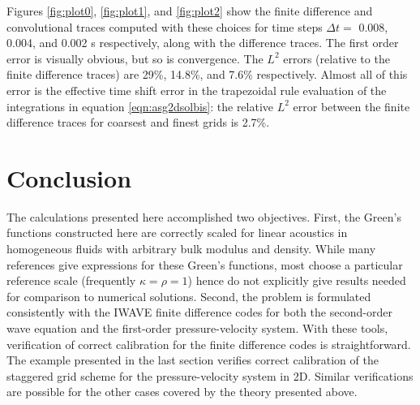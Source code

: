 Figures \ref{fig:plot0}, \ref{fig:plot1}, and \ref{fig:plot2} show
the finite difference and convolutional traces computed with these choices for time steps $\Delta t = $
0.008, 0.004, and 0.002 s respectively, along with the difference
traces. The first order error is visually obvious, but so is
convergence. The $L^2$ errors (relative to the finite difference
traces) are 29\%, 14.8\%, and 7.6\% respectively. Almost all of this
error is the effective time shift error in the trapezoidal rule evaluation of
the integrations in equation \ref{eqn:asg2dsolbis}: the relative $L^2$
error between the finite difference traces for coarsest and finest
grids is 2.7\%.




\section{Conclusion}
The calculations presented here accomplished two objectives. First,
the Green's functions constructed here are correctly scaled for linear
acoustics in homogeneous fluids with arbitrary bulk modulus and
density. While many references give expressions for these Green's
functions, most choose a particular reference scale (frequently
$\kappa = \rho = 1$) hence do not explicitly give results needed for
comparison to numerical solutions. Second, the problem is formulated
consistently with the IWAVE finite difference codes for both the
second-order wave equation and the first-order pressure-velocity
system. With these tools, verification of correct calibration for the
finite difference codes is straightforward. The example presented in
the last section verifies correct calibration of the staggered grid
scheme for the pressure-velocity system in 2D. Similar verifications
are possible for the other cases covered by the theory presented above.





